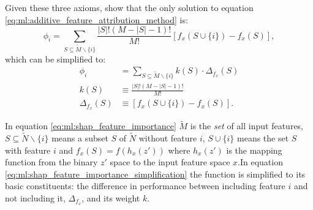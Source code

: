 \documentclass[a4paper, twoside, nobib]{tufte-book}
\begin{document}
Given these three axioms, \citet{Lundberg:2017} show that the only solution to equation \eqref{eq:ml:additive_feature_attribution_method} is:
\begin{equation}
  \label{eq:ml:shap_feature_importance}
    \phi_i = \sum_{S \subseteq \tilde{M} \backslash \{i\}} \frac{|S|!(M-|S|-1)!}{M!} \left[ f_x(S \cup \{i\}) - f_x(S) \right] ,
\end{equation}
which can be simplified to:
\begin{equation}
  \label{eq:ml:shap_feature_importance_simplification}
  \begin{split}
    \phi_i        &= \sum_{S \subseteq \tilde{M} \backslash \{i\}} k(S) \cdot \Delta_{f_x}(S) \\
    k(S)             &\equiv \frac{|S|!(M-|S|-1)!}{M!} \\
    \Delta_{f_x}(S)  &\equiv \left[ f_x(S \cup \{i\}) - f_x(S) \right].
  \end{split}
\end{equation}


In equation \eqref{eq:ml:shap_feature_importance} $\tilde{M}$ is the \emph{set} of all input features, $S \subseteq \tilde{N} \backslash \{i\}$ means a subset $S$ of $\tilde{N}$ without feature $i$, $S \cup \{i\}$ means the set $S$ with feature $i$ and $f_x(S) = f(h_x(z'))$ where $h_x(z')$ is the mapping function from the binary $z'$ space to the input feature space $x$.In equation \eqref{eq:ml:shap_feature_importance_simplification} the function is simplified to its basic constituents: the difference in performance  between including feature $i$ and not including it, $\Delta_{f_x}$, and its weight $k$. 
\end{document}
